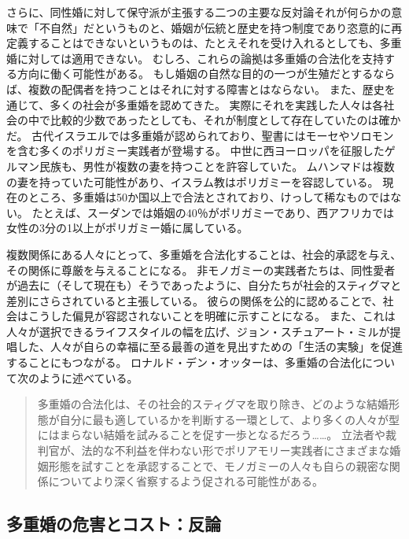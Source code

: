 \documentclass[paper=a4,book,openany]{jlreq} \usepackage{mystyle}
\begin{document}
さらに、同性婚に対して保守派が主張する二つの主要な反対論{\DDASH}それが何らかの意味で「不自然」だというものと、婚姻が伝統と歴史を持つ制度であり恣意的に再定義することはできないというもの{\DDASH}は、たとえそれを受け入れるとしても、多重婚に対しては適用できない。
むしろ、これらの論拠は多重婚の合法化を支持する方向に働く可能性がある。
もし婚姻の自然な目的の一つが生殖だとするならば、複数の配偶者を持つことはそれに対する障害とはならない。
また、歴史を通じて、多くの社会が多重婚を認めてきた。
実際にそれを実践した人々は各社会の中で比較的少数であったとしても、それが制度として存在していたのは確かだ。
古代イスラエルでは多重婚が認められており、聖書にはモーセやソロモンを含む多くのポリガミー実践者が登場する。
中世に西ヨーロッパを征服したゲルマン民族も、男性が複数の妻を持つことを許容していた。
ムハンマドは複数の妻を持っていた可能性があり、イスラム教はポリガミーを容認している。
現在のところ、多重婚は50か国以上で合法とされており、けっして稀なものではない。
たとえば、スーダンでは婚姻の40％がポリガミーであり、西アフリカでは女性の3分の1以上がポリガミー婚に属している\citep{economist17:_link_between_polyg_war,dalton14:_why_is_polyg_more_preval_wester_afric}。

複数関係にある人々にとって、多重婚を合法化することは、社会的承認を与え、その関係に尊厳を与えることになる。
非モノガミーの実践者たちは、同性愛者が過去に（そして現在も）そうであったように、自分たちが社会的スティグマと差別にさらされていると主張している。
彼らの関係を公的に認めることで、社会はこうした偏見が容認されないことを明確に示すことになる。
また、これは人々が選択できるライフスタイルの幅を広げ、ジョン・スチュアート・ミルが提唱した、人々が自らの幸福に至る最善の道を見出すための「生活の実験」を促進することにもつながる\citep[p.57]{mill89:_liber_other_writin}。
ロナルド・デン・オッターは、多重婚の合法化について次のように述べている。

\begin{quote}
多重婚の合法化は、その社会的スティグマを取り除き、どのような結婚形態が自分に最も適しているかを判断する一環として、より多くの人々が型にはまらない結婚を試みることを促す一歩となるだろう……。
立法者や裁判官が、法的な不利益を伴わない形でポリアモリー実践者にさまざまな婚姻形態を試すことを承認することで、モノガミーの人々も自らの親密な関係についてより深く省察するよう促される可能性がある。
\citep{otter18:_perfec_argum_legal_recog_polyam_relat}
\end{quote}

\subsection{多重婚の危害とコスト：反論}
\end{document}
